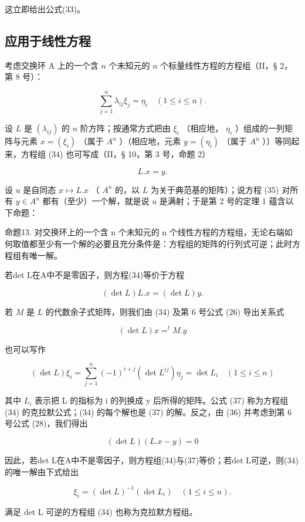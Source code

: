 这立即给出公式(33)。

\subsection{应用于线性方程}

考虑交换环 A 上的一个含 \(n\) 个未知元的 \(n\) 个标量线性方程的方程组（II，§ 2，第 8 号）：

\[
\sum_ {j = 1} ^ {n} \lambda_ {i j} \xi_ {j} = \eta_ {i} \quad (1 \leqslant i \leqslant n).\tag{34}
\]

设 \(L\) 是 \((\lambda_{ij})\) 的 \(n\) 阶方阵；按通常方式把由 \(\xi_i\) （相应地， \(\eta_i\) ）组成的一列矩阵与元素 \(x = (\xi_i)\) （属于 \(A^n\) ）（相应地，元素 \(y = (\eta_i)\) （属于 \(A^n\) ））等同起来，方程组 (34) 也可写成（II，§ 10，第 3 号，命题 2）

\[
L. x = y.\tag{35}
\]

设 \(u\) 是自同态 \(x \mapsto L.x\) （ \(A^n\) 的，以 \(L\) 为关于典范基的矩阵）；说方程 (35) 对所有 \(y \in A^n\) 都有（至少）一个解，就是说 \(u\) 是满射；于是第 2 号的定理 1 蕴含以下命题：

命题13. 对交换环上的一个含 n 个未知元的 n 个线性方程的方程组，无论右端如何取值都至少有一个解的必要且充分条件是：方程组的矩阵的行列式可逆；此时方程组有唯一解。

若det L在A中不是零因子，则方程(34)等价于方程

\[
(\det L) L. x = (\det L) y.
\]

若 \(M\) 是 \(L\) 的代数余子式矩阵，则我们由 (34) 及第 6 号公式 (26) 导出关系式

\[
(\det L) x = ^ {t} M. y\tag{36}
\]

也可以写作

\[
(\det L) \xi_ {i} = \sum_ {j = 1} ^ {n} (- 1) ^ {i + j} (\det L ^ {i j}) \eta_ {j} = \det L _ {i} \quad (1 \leqslant i \leqslant n)\tag{37}
\]

其中 \(L_{i}\) 表示把 L 的指标为 i 的列换成 y 后所得的矩阵。公式 (37) 称为方程组 (34) 的克拉默公式；(34) 的每个解也是 (37) 的解。反之，由 (36) 并考虑到第 6 号公式 (28)，我们得出

\[
(\det L) (L. x - y) = 0\tag{38}
\]

因此，若det L在A中不是零因子，则方程组(34)与(37)等价；若det L可逆，则(34)的唯一解由下式给出

\[
\xi_ {i} = (\det L) ^ {- 1} (\det L _ {i}) \quad (1 \leqslant i \leqslant n).\tag{39}
\]

满足 det L 可逆的方程组 (34) 也称为克拉默方程组。

